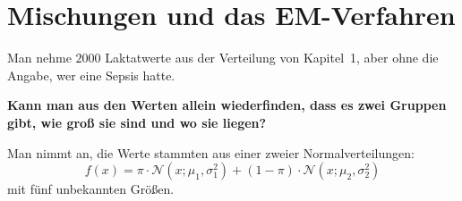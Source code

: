 \section{Mischungen und das EM-Verfahren}

\begin{merksatz}
Man nehme $2000$ Laktatwerte aus der Verteilung von Kapitel~1, aber ohne die Angabe, wer eine Sepsis hatte.

\begin{center}
\begin{minipage}{0.9\textwidth}
\textbf{Kann man aus den Werten allein wiederfinden, dass es zwei Gruppen gibt, wie groß sie sind und wo sie liegen?}
\end{minipage}
\end{center}

Man nimmt an, die Werte stammten aus einer  zweier Normalverteilungen:
\[ f(x) = \pi\cdot\mathcal N(x;\mu_1,\sigma_1^{2}) + (1-\pi)\cdot\mathcal N(x;\mu_2,\sigma_2^{2}) \]
mit fünf unbekannten Größen.
\end{merksatz}

